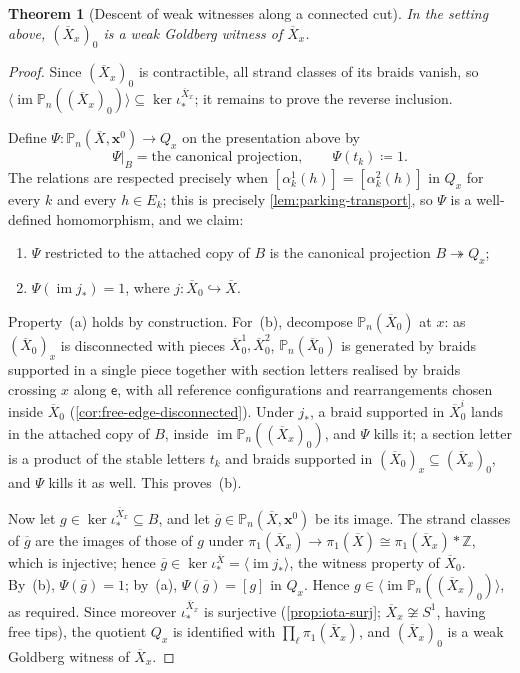 \documentclass[reqno]{amsart}
\newtheorem{theorem}{Theorem}[section]
\theoremstyle{definition}
\newcommand\bfx{\mathbf{x}}
\newcommand\sfe{\mathsf{e}}
\newcommand{\PB}{\mathbb{P}}
\newcommand{\im}{\operatorname{im}}
\newcommand{\Z}{\mathbb{Z}}
\newcommand{\co}[1]{\mathopen{\langle}#1\mathclose{\rangle}} %
\newcommand{\base}{\bfx^0}
\renewcommand{\bar}{\overline}
\numberwithin{equation}{section}
\begin{document}
\begin{theorem}[Descent of weak witnesses along a connected cut]
\label{thm:witness-descent}
In the setting above, \((\bar X_x)_0\) is a weak Goldberg
witness of \(\bar X_x\).
\end{theorem}

\begin{proof}
Since \((\bar X_x)_0\) is contractible, all strand classes of
its braids vanish, so
\(\co{\im\PB_n((\bar X_x)_0)}\subseteq\ker\iota^{\bar X_x}_\ast\);
it remains to prove the reverse inclusion.

Define \(\Psi\colon\PB_n(\bar X,\base)\to Q_x\) on the
presentation above by
\[
\Psi|_{B}=\text{the canonical projection},
\qquad
\Psi(t_k)\coloneqq1 .
\]
The relations are respected precisely when
\([\alpha^1_k(h)]=[\alpha^2_k(h)]\) in \(Q_x\) for every \(k\)
and every \(h\in E_k\); this is precisely
\cref{lem:parking-transport}, so \(\Psi\) is a
well-defined homomorphism, and we claim:
\begin{enumerate}[label=(\alph*), leftmargin=2em]
  \item \(\Psi\) restricted to the attached copy of \(B\) is
        the canonical projection \(B\twoheadrightarrow Q_x\);
  \item \(\Psi(\im j_\ast)=1\), where
        \(j\colon\bar X_0\hookrightarrow\bar X\).
\end{enumerate}
Property~(a) holds by construction. For~(b), decompose
\(\PB_n(\bar X_0)\) at \(x\): as \((\bar X_0)_x\) is
disconnected with pieces \(\bar X_0^1,\bar X_0^2\),
\(\PB_n(\bar X_0)\) is generated by braids supported in a
single piece together with section letters realised by braids
crossing \(x\) along \(\sfe\), with all reference configurations
and rearrangements chosen inside \(\bar X_0\)
(\cref{cor:free-edge-disconnected}). Under \(j_\ast\), a braid
supported in \(\bar X_0^i\) lands in the attached copy of
\(B\), inside \(\im\PB_n((\bar X_x)_0)\), and \(\Psi\) kills
it; a section letter is a product of the stable letters
\(t_k\) and braids supported in
\((\bar X_0)_x\subseteq(\bar X_x)_0\), and \(\Psi\) kills it as
well. This proves~(b).

Now let \(g\in\ker\iota^{\bar X_x}_\ast\subseteq B\), and let
\(\bar g\in\PB_n(\bar X,\base)\) be its image. The strand
classes of \(\bar g\) are the images of those of \(g\) under
\(\pi_1(\bar X_x)\to\pi_1(\bar X)\cong\pi_1(\bar X_x)\ast\Z\),
which is injective; hence
\(\bar g\in\ker\iota^{\bar X}_\ast=\co{\im j_\ast}\), the
witness property of \(\bar X_0\). By~(b),
\(\Psi(\bar g)=1\); by~(a), \(\Psi(\bar g)=[g]\) in \(Q_x\).
Hence \(g\in\co{\im\PB_n((\bar X_x)_0)}\), as required. Since
moreover \(\iota^{\bar X_x}_\ast\) is surjective
(\cref{prop:iota-surj}; \(\bar X_x\not\cong S^1\), having free
tips), the quotient \(Q_x\) is identified with
\(\prod_\ell\pi_1(\bar X_x)\), and \((\bar X_x)_0\) is a weak
Goldberg witness of \(\bar X_x\).
\end{proof}
\end{document}
